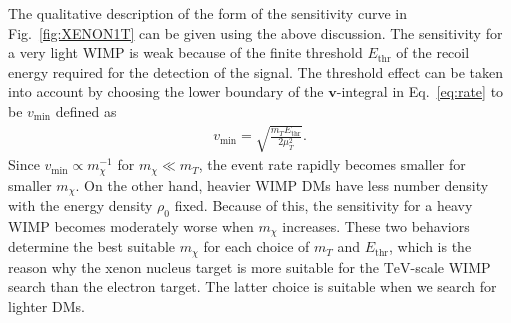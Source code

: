 \documentclass[12pt,twoside,book]{article}
\begin{document}
The qualitative description of the form of the sensitivity curve in Fig.~\ref{fig:XENON1T} can be given using the above discussion.
The sensitivity for a very light WIMP is weak because of the finite threshold $E_{\mathrm{thr}}$ of the recoil energy required for the detection of the signal.
The threshold effect can be taken into account by choosing the lower boundary of the $\bm{v}$-integral in Eq.~\eqref{eq:rate} to be $v_{\mathrm{min}}$ defined as
\begin{align}
  v_{\mathrm{min}} = \sqrt{\frac{m_T E_{\mathrm{thr}}}{2 \mu_T^2}}.
\end{align}
Since $v_{\mathrm{min}} \propto m_\chi^{-1}$ for $m_\chi \ll m_T$, the event rate rapidly becomes smaller for smaller $m_\chi$.
On the other hand, heavier WIMP DMs have less number density with the energy density $\rho_0$ fixed.
Because of this, the sensitivity for a heavy WIMP becomes moderately worse when $m_\chi$ increases.
These two behaviors determine the best suitable $m_\chi$ for each choice of $m_T$ and $E_{\mathrm{thr}}$, which is the reason why the xenon nucleus target is more suitable for the $\mathrm{TeV}$-scale WIMP search than the electron target.
The latter choice is suitable when we search for lighter DMs.
\end{document}
